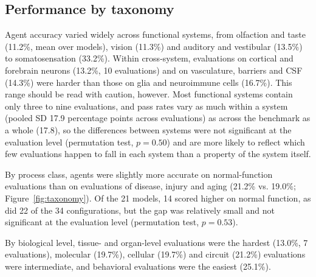 \subsection*{Performance by taxonomy}
Agent accuracy varied widely across functional systems, from olfaction and taste (11.2\%, mean over models), vision (11.3\%) and auditory and vestibular (13.5\%) to somatosensation (33.2\%). Within cross-system, evaluations on cortical and forebrain neurons (13.2\%, 10 evaluations) and on vasculature, barriers and CSF (14.3\%) were harder than those on glia and neuroimmune cells (16.7\%). This range should be read with caution, however. Most functional systems contain only three to nine evaluations, and pass rates vary as much within a system (pooled SD 17.9 percentage points across evaluations) as across the benchmark as a whole (17.8), so the differences between systems were not significant at the evaluation level (permutation test, $p = 0.50$) and are more likely to reflect which few evaluations happen to fall in each system than a property of the system itself.

By process class, agents were slightly more accurate on normal-function evaluations than on evaluations of disease, injury and aging (21.2\% vs. 19.0\%; Figure~\ref{fig:taxonomy}). Of the 21 models, 14 scored higher on normal function, as did 22 of the 34 configurations, but the gap was relatively small and not significant at the evaluation level (permutation test, $p = 0.53$).

By biological level, tissue- and organ-level evaluations were the hardest (13.0\%, 7 evaluations), molecular (19.7\%), cellular (19.7\%) and circuit (21.2\%) evaluations were intermediate, and behavioral evaluations were the easiest (25.1\%).
